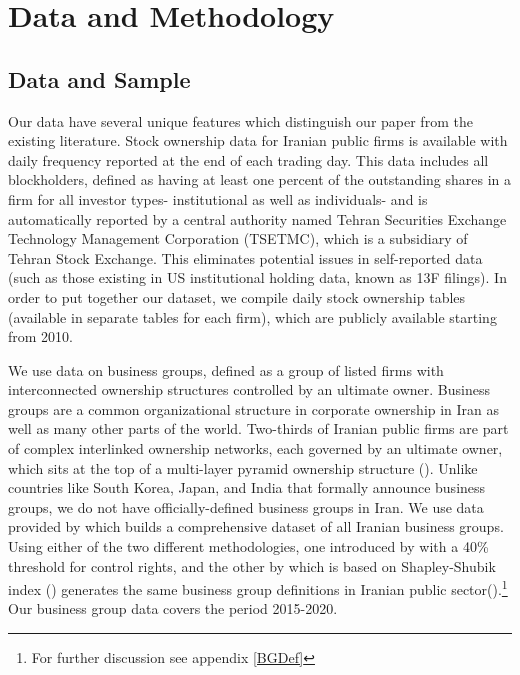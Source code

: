 
\section{{Data and Methodology}}



\subsection{{Data and Sample}}



Our data have several unique features which distinguish our paper from the existing literature. Stock ownership data for Iranian public firms is available with daily frequency reported at the end of each trading day. This data includes all blockholders, defined as having at least one percent of the outstanding shares in a firm for all investor types- institutional as well as individuals- and is automatically reported by a central authority named Tehran Securities Exchange Technology Management Corporation (TSETMC), which is a subsidiary of Tehran Stock Exchange. This eliminates potential issues in self-reported data (such as those existing in US institutional holding data, known as 13F filings). In order to put together our dataset, we compile daily stock ownership tables (available in separate tables for each firm), which are publicly available starting from 2010.

We use data on business groups, defined as a group of listed firms with interconnected ownership structures controlled by an ultimate owner. Business groups are a common organizational structure in corporate ownership in Iran as well as many other parts of the world. Two-thirds of Iranian public firms are part of complex interlinked ownership networks, each governed by an ultimate owner, which sits at the top of a multi-layer pyramid ownership structure ({\cite{Aliabadi2022}}). Unlike countries like South Korea, Japan, and India that formally announce business groups, we do not have officially-defined business groups in Iran. We use data provided by {\cite{Aliabadi2022}} which builds a comprehensive dataset of all Iranian business groups. Using either of the two different methodologies, one introduced by \cite{almeida2011structure} with a 40\% threshold for control rights, and the other by \cite{aminadav2011rebuilding} which is based on Shapley-Shubik index (\cite{shapley1954method}) generates the same business group definitions in Iranian public sector({\cite{Aliabadi2022}}).\footnote{For further discussion see appendix \ref{BGDef}}  Our business group data covers the period 2015-2020.  



